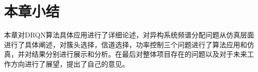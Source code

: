 \section{本章小结}
本章对DRQN算法具体应用进行了详细论述，对异构系统频谱分配问题从仿真层面进行了具体阐述，对簇头选择，信道选择，功率控制三个问题进行了算法应用和仿真，并对结果分别进行展示和分析。在最后对整体项目存在的问题以及对于未来工作方向进行了展望，提出了自己的意见。





















